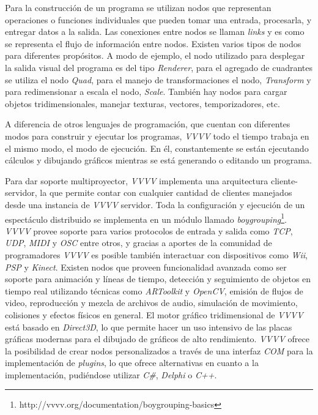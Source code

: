 Para la construcción de un programa se utilizan nodos que representan operaciones o funciones individuales que pueden tomar una entrada, procesarla, y entregar datos a la salida. Las conexiones entre nodos se llaman \emph{links} y es como se representa el flujo de información entre nodos.
Existen varios tipos de nodos para diferentes propósitos. A modo de ejemplo, el nodo utilizado para desplegar la salida visual del programa es del tipo \emph{Renderer}, para el agregado de cuadrantes se utiliza el nodo \emph{Quad}, para el manejo de transformaciones el nodo, \emph{Transform} y para redimensionar a escala el nodo, \emph{Scale}. También hay nodos para cargar objetos tridimensionales, manejar texturas, vectores, temporizadores, etc.

A diferencia de otros lenguajes de programación, que cuentan con diferentes modos para construir y ejecutar los programas, \emph{VVVV} todo el tiempo trabaja en el mismo modo, el modo de ejecución. En él, constantemente se están ejecutando cálculos y dibujando gráficos mientras se está generando o editando un programa.

Para dar soporte multiproyector, \emph{VVVV} implementa una arquitectura cliente-servidor, la que permite contar con cualquier cantidad de clientes manejados desde una instancia de \emph{VVVV} servidor. Toda la configuración y ejecución de un espectáculo distribuido se implementa en un módulo llamado \emph{boygrouping}\footnote{http://vvvv.org/documentation/boygrouping-basics}.
\emph{VVVV} provee soporte para varios protocolos de entrada y salida como \emph{TCP}, \emph{UDP}, \emph{MIDI} y \emph{OSC} entre otros, y gracias a aportes de la comunidad de programadores \emph{VVVV} es posible también interactuar con dispositivos como \emph{Wii}, \emph{PSP} y \emph{Kinect}. Existen nodos que proveen funcionalidad avanzada como ser soporte para animación y líneas de tiempo, detección y seguimiento de objetos en tiempo real utilizando técnicas como \emph{ARToolkit} y \emph{OpenCV}, emisión de flujos de video, reproducción y mezcla de archivos de audio, simulación de movimiento, colisiones y efectos físicos en general.
El motor gráfico tridimensional de \emph{VVVV} está basado en \emph{Direct3D}, lo que permite hacer un uso intensivo de las placas gráficas modernas para el dibujado de gráficos de alto rendimiento.
\emph{VVVV} ofrece la posibilidad de crear nodos personalizados a través de una interfaz \emph{COM} para la implementación de \emph{plugins}, lo que ofrece alternativas en cuanto a la implementación, pudiéndose utilizar \emph{C\#}, \emph{Delphi} o \emph{C++}.

